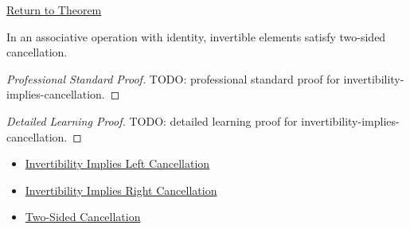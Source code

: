 \newpage
{}
\label{prf:invertibility-implies-cancellation}

\begin{remark*}[Return]
\hyperref[prop:invertibility-implies-cancellation]{Return to Theorem}
\end{remark*}

\begin{proposition*}
In an associative operation with identity, invertible elements satisfy
two-sided cancellation.
\end{proposition*}

\begin{proof}[Professional Standard Proof]
\LRAProofBodyStart
TODO: professional standard proof for invertibility-implies-cancellation.
\end{proof}

\begin{proof}[Detailed Learning Proof]
\LRAProofBodyStart
TODO: detailed learning proof for invertibility-implies-cancellation.
\end{proof}

\begin{remark*}
\end{remark*}

\begin{dependencies}
\begin{itemize}
  \item \hyperref[prop:invertibility-implies-left-cancellation]{Invertibility Implies Left Cancellation}
  \item \hyperref[prop:invertibility-implies-right-cancellation]{Invertibility Implies Right Cancellation}
  \item \hyperref[def:two-sided-cancellation]{Two-Sided Cancellation}
\end{itemize}
\end{dependencies}

\clearpage
